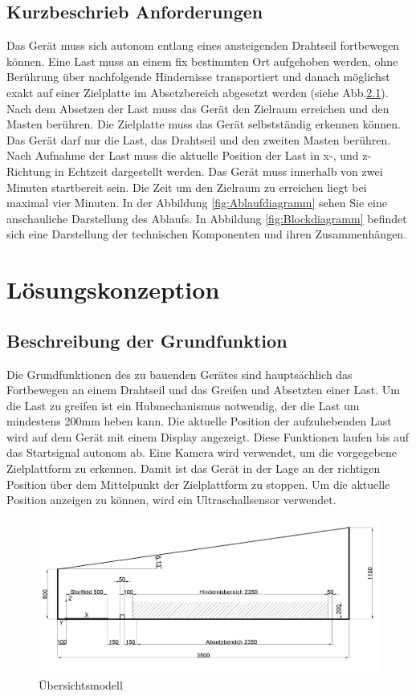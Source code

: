 \documentclass[a4paper]{report}
\begin{document}
\section{Kurzbeschrieb Anforderungen}
\label{sec:KurzAnforder}
Das Gerät muss sich autonom entlang eines ansteigenden Drahtseil fortbewegen können. Eine Last muss an einem fix bestimmten Ort aufgehoben werden, ohne Berührung über nachfolgende Hindernisse transportiert und danach möglichst exakt auf einer Zielplatte im Absetzbereich abgesetzt werden (siehe Abb.\ref{fig:Funktionsskizze}). Nach dem Absetzen der Last muss das Gerät den Zielraum erreichen und den Masten berühren. Die Zielplatte muss das Gerät selbstständig erkennen können. Das Gerät darf nur die Last, das Drahtseil und den zweiten Masten berühren. Nach Aufnahme der Last muss die aktuelle Position der Last in x-, und z-Richtung in Echtzeit dargestellt werden. Das Gerät muss innerhalb von zwei Minuten startbereit sein. Die Zeit um den Zielraum zu erreichen liegt bei maximal vier Minuten. In der Abbildung \ref{fig:Ablaufdiagramm} sehen Sie eine anschauliche Darstellung des Ablaufs.
In Abbildung \ref{fig:Blockdiagramm} befindet sich eine Darstellung der technischen Komponenten und ihren Zusammenhängen.

\chapter{Lösungskonzeption}
\label{ch:Loesungskonzept}

\section{Beschreibung der Grundfunktion}
\label{sec:GrundBeschrieb}
Die Grundfunktionen des zu bauenden Gerätes sind hauptsächlich das Fortbewegen an einem Drahtseil und das Greifen und Absetzten einer Last. Um die Last zu greifen ist ein Hubmechanismus notwendig, der die Last um mindestens 200mm heben kann. Die aktuelle Position der aufzuhebenden Last wird auf dem Gerät mit einem Display angezeigt. Diese Funktionen laufen bis auf das Startsignal autonom ab. Eine Kamera wird verwendet, um die vorgegebene Zielplattform zu erkennen. Damit ist das Gerät in der Lage an der richtigen Position über dem Mittelpunkt der Zielplattform zu stoppen. Um die aktuelle Position anzeigen zu können, wird ein Ultraschallsensor verwendet.

\begin{figure}[h!]
	\includegraphics[keepaspectratio,width=\textwidth]{PrenFunktionsskizze}
	\caption{Übersichtsmodell}
	\label{fig:Funktionsskizze}
\end{figure}
\end{document}
